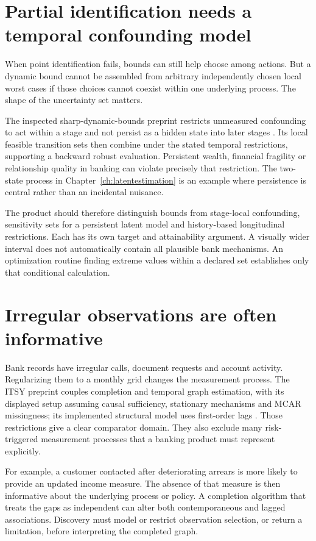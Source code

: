 \section{Partial identification needs a temporal confounding model}
When point identification fails, bounds can still help choose among
actions. But a dynamic bound cannot be assembled from arbitrary
independently chosen local worst cases if those choices cannot coexist
within one underlying process. The shape of the uncertainty set matters.

The inspected sharp-dynamic-bounds preprint restricts unmeasured
confounding to act within a stage and not persist as a hidden state into
later stages \citep{sharpdynamic2026}. Its local feasible transition sets
then combine under the stated temporal restrictions, supporting a
backward robust evaluation. Persistent wealth, financial fragility or
relationship quality in banking can violate precisely that restriction.
The two-state process in Chapter~\ref{ch:latentestimation} is an example
where persistence is central rather than an incidental nuisance.

The product should therefore distinguish bounds from stage-local
confounding, sensitivity sets for a persistent latent model and
history-based longitudinal restrictions. Each has its own target and
attainability argument. A visually wider interval does not automatically
contain all plausible bank mechanisms. An optimization routine finding
extreme values within a declared set establishes only that conditional
calculation.

\section{Irregular observations are often informative}
Bank records have irregular calls, document requests and account activity.
Regularizing them to a monthly grid changes the measurement process.
The ITSY preprint couples completion and temporal graph estimation,
with its displayed setup assuming causal sufficiency, stationary
mechanisms and MCAR missingness; its implemented structural model uses
first-order lags \citep[Section 3]{itsy2026}. Those restrictions give a
clear comparator domain. They also exclude many risk-triggered measurement
processes that a banking product must represent explicitly.

For example, a customer contacted after deteriorating arrears is more
likely to provide an updated income measure. The absence of that measure
is then informative about the underlying process or policy. A completion
algorithm that treats the gaps as independent can alter both contemporaneous
and lagged associations. Discovery must model or restrict observation
selection, or return a limitation, before interpreting the completed graph.

